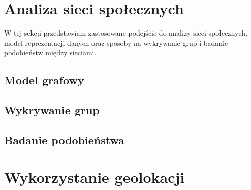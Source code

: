 \section{Analiza sieci społecznych}
\label{section:siecispoleczne}
W tej sekcji przedstawiam zastosowane podejście do analizy sieci społecznych,
model reprezentacji danych oraz sposoby na wykrywanie grup i badanie podobieństw
między sieciami.
\subsection{Model grafowy}

\clearpage
\subsection{Wykrywanie grup}
\subsection{Badanie podobieństwa}




\section{Wykorzystanie geolokacji}
\label{section:wykorzystaniegeolokacji}
